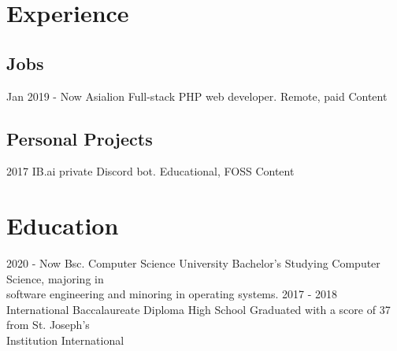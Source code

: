 \documentclass[]{jvcv}
\begin{document}
\section{Experience}

\subsection{Jobs}
\vspace{0.05cm}

\begin{jobslist}
	\jobentry
		{Jan 2019 - Now}
		{Asialion {\normalfont Full-stack PHP web developer.}}
		{Remote, paid}
		{Content}
\end{jobslist}

%
\vspace{0.1cm}
\subsection{Personal Projects}
\vspace{0.05cm}

\begin{projectslist}
	\projectentry
		{2017}
		{IB.ai {\normalfont private Discord bot.}}
		{Educational, FOSS}
		{Content}
\end{projectslist}

%
\vspace{0.5cm}
\section{Education}

\begin{edulist}
	\eduentry
		{2020 - Now}
		{Bsc. Computer Science}
		{University Bachelor's}
		{Studying Computer Science, majoring in\\
		software engineering and minoring in operating systems.}
	\eduentry
		{2017 - 2018}
		{International Baccalaureate Diploma}
		{High School}
		{Graduated with a score of 37 from St. Joseph's\\
		Institution International}
\end{edulist}
\end{document}
